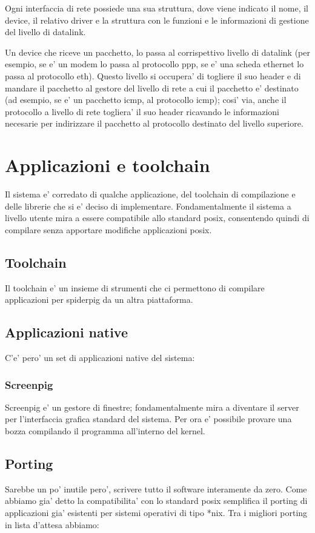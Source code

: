 \documentclass[a4paper,10pt]{book}
\begin{document}
Ogni interfaccia di rete possiede una sua struttura, dove viene indicato il nome,
il device, il relativo driver e la struttura con le funzioni e le informazioni di gestione 
del livello di datalink.

Un device che riceve un pacchetto, lo passa al corrispettivo livello di datalink (per esempio, se e' un modem 
lo passa al protocollo ppp, se e' una scheda ethernet lo passa al protocollo eth). Questo livello si occupera'
di togliere il suo header e di mandare il pacchetto al gestore del livello di rete a cui il pacchetto e' destinato
(ad esempio, se e' un pacchetto icmp, al protocollo icmp); cosi' via, anche il protocollo a livello di rete
togliera' il suo header ricavando le informazioni necesarie per indirizzare il pacchetto al protocollo destinato
del livello superiore. 



\chapter{Applicazioni e toolchain}
Il sistema e' corredato di qualche applicazione, del toolchain di compilazione e delle librerie che si e' deciso
di implementare. Fondamentalmente il sistema a livello utente mira a essere compatibile allo standard posix,
consentendo quindi di compilare senza apportare modifiche applicazioni posix. 

\section{Toolchain}
Il toolchain e' un insieme di strumenti che ci permettono di compilare applicazioni per spiderpig
da un altra piattaforma.

\section{Applicazioni native}
C'e' pero' un set di applicazioni native del sistema:

\subsection{Screenpig}
Screenpig e' un gestore di finestre; fondamentalmente mira a diventare il server per l'interfaccia grafica
standard del sistema. Per ora e' possibile provare una bozza compilando il programma all'interno del kernel.

\section{Porting}
Sarebbe un po' inutile pero', scrivere tutto il software interamente da zero. Come abbiamo gia' detto
la compatibilita' con lo standard posix semplifica il porting di applicazioni gia' esistenti per sistemi operativi
di tipo *nix. Tra i migliori porting in lista d'attesa abbiamo:
\end{document}
